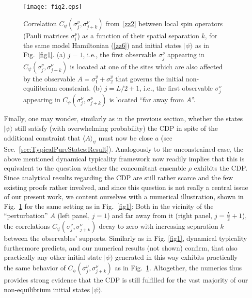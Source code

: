 \documentclass[twocolumn,aps,prb,floatfix,superscriptaddress]{revtex4-2}
\newcommand{\ket}[1]{\lvert #1 \rangle} 	%
\newcommand{\<}{\left\langle}	%
\renewcommand{\>}{\right\rangle}	%
\begin{document}
\begin{figure}
\texttt{[image: fig2.eps]}
\caption{Correlation $C_\psi(\sigma^\nu_{j}, \sigma^\nu_{j+k})$ from~\eqref{zz2} 
between local spin operators 
(Pauli matrices $\sigma_i^{\nu}$) as a 
function of their spatial separation $k$,
for the same model Hamiltonian (\ref{zz6}) 
and initial states $\ket\psi$ as in Fig.~\ref{fig1}.
(a) $j=1$, i.e., the first observable $\sigma^\nu_{j}$
appearing in $C_\psi(\sigma^\nu_{j}, \sigma^\nu_{j+k})$
is located at one of the sites which are also affected by the
observable $A=\sigma^y_1 + \sigma^y_2$
that governs the initial non-equilibrium constraint.
(b) $j = L/2+1$, i.e., the first observable $\sigma^\nu_{j}$ appearing 
in $C_\psi(\sigma^\nu_{j}, \sigma^\nu_{j+k})$ 
is located ``far away from $A$''.
}
\label{fig2}
\end{figure}

Finally, one may wonder, similarly as 
in the previous section, whether the states $|\psi\rangle$
still satisfy (with overwhelming probability) the CDP in spite 
of the additional constraint that $\langle A\rangle_{\!\psi}$
must now be close $a$ (see
Sec.~\ref{sec:TypicalPureStates:Result}).
Analogously to the unconstrained case, 
the above mentioned dynamical typicality framework 
 \cite{bar09,rei20} now readily implies 
that this is equivalent to the question whether the
concomitant
ensemble $\rho$ 
exhibits the CDP.
Since analytical results regarding the CDP
are still rather scarce and the few existing proofs 
rather involved, and since this question is not
really a central issue of our present work,
we content ourselves with a numerical illustration, 
shown in Fig.~\ref{fig2} for the same setting as in Fig.~\ref{fig1}:
Both in the vicinity of the ``perturbation'' $A$
(left panel, $j = 1$) and far away from it (right panel, $j = \frac{L}{2}+1$), 
the correlations $C_\psi(\sigma^\nu_{j}, \sigma^\nu_{j+k})$
decay to zero with increasing separation $k$ between the
observables' supports.
Similarly as in Fig. \ref{fig1}, dynamical typicality furthermore 
predicts, and our numerical results (not shown) confirm, that also 
practically any other 
initial state $\ket\psi$ generated in this way exhibits practically 
the same behavior of $C_\psi(\sigma^\nu_{j}, \sigma^\nu_{j+k})$ as 
in Fig.~\ref{fig2}.
Altogether, the numerics thus provides strong evidence that
the CDP is still fulfilled for the vast majority of our
non-equilibrium initial states $|\psi\rangle$.
\end{document}

